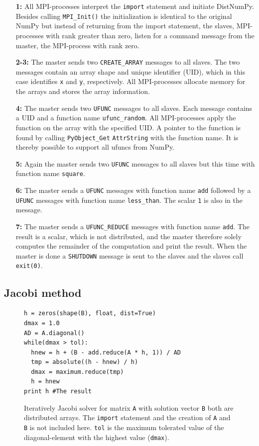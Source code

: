 \documentclass{sigplanconf}
\begin{document}
\begin{enumerate}
\item[\textbf{1:}] All MPI-processes interpret the \texttt{import} statement and initiate DistNumPy. Besides calling \texttt{MPI\_Init()} the initialization is identical to the original NumPy but instead of returning from the import statement, the slaves, MPI-processes with rank greater than zero, listen for a command message from the master, the MPI-process with rank zero.
\item[\textbf{2-3:}] The master sends two \texttt{CREATE\_ARRAY} messages to all slaves. The two messages contain an array shape and unique identifier (UID), which in this case identifies \texttt{x} and \texttt{y}, respectively. All MPI-processes allocate memory for the arrays and stores the array information.
\item[\textbf{4:}] The master sends two \texttt{UFUNC} messages to all slaves. Each message contains a UID and a function name \texttt{ufunc\_random}. All MPI-processes apply the function on the array with the specified UID. A pointer to the function is found by calling \texttt{PyObject\_Get} \texttt{AttrString} with the function name. It is thereby possible to support all ufuncs from NumPy.
\item[\textbf{5:}] Again the master sends two \texttt{UFUNC} messages to all slaves but this time with function name \texttt{square}.
\item[\textbf{6:}] The master sends a \texttt{UFUNC} messages with function name \texttt{add} followed by a \texttt{UFUNC} messages with function name \texttt{less\_than}. The scalar \texttt{1} is also in the message.
\item[\textbf{7:}] The master sends a \texttt{UFUNC\_REDUCE} messages with function name \texttt{add}. The result is a scalar, which is not distributed, and the master therefore solely computes the remainder of the computation and print the result. When the master is done a \texttt{SHUTDOWN} message is sent to the slaves and the slaves call \texttt{exit(0)}.
\end{enumerate}


\subsection{Jacobi method}
\begin{figure}
\begin{lstlisting}
h = zeros(shape(B), float, dist=True)
dmax = 1.0
AD = A.diagonal()
while(dmax > tol):
  hnew = h + (B - add.reduce(A * h, 1)) / AD
  tmp = absolute((h - hnew) / h)
  dmax = maximum.reduce(tmp)
  h = hnew
print h #The result
\end{lstlisting}
 \caption{Iteratively Jacobi solver for matrix \texttt{A} with solution vector \texttt{B} both are distributed arrays. The \texttt{import} statement and the creation of \texttt{A} and \texttt{B} is not included here.
 \texttt{tol} is the maximum tolerated value of the diagonal-element with the highest value (\texttt{dmax}).}
 \label{lst:jocobi}
\end{figure}
\end{document}
